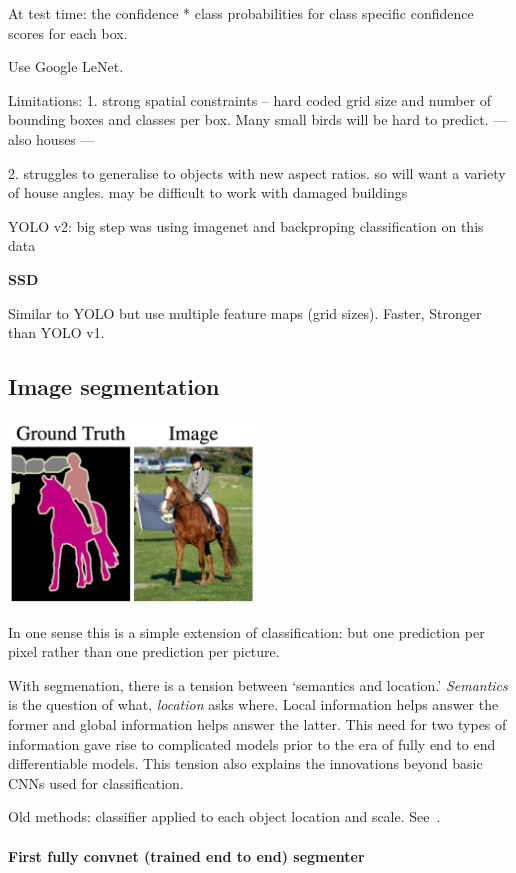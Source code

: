 \documentclass[12pt, a4paper, oneside, headinclude, footinclude]{article}
\begin{document}
At test time: the confidence * class probabilities for class specific
confidence scores for each box.

Use Google LeNet.

Limitations: 
1. strong spatial constraints -- hard coded grid size and number of
bounding boxes and classes per box. Many small birds will be hard to predict.
--- also houses ---

2. struggles to generalise to objects with new aspect ratios. so will want a
variety of house angles. may be difficult to work with damaged buildings 

YOLO v2: big step was using imagenet and backproping classification on this
data

\textbf{SSD}~\cite{liu2016ssd}

Similar to YOLO but use multiple feature maps (grid sizes). Faster, Stronger
than YOLO v1.

\subsection{Image segmentation}

\includegraphics[width=0.5\textwidth]{Figures/segmentation-example.png}

In one sense this is a simple extension of classification: but one prediction
per pixel rather than one prediction per picture.

With segmenation, there is a tension between `semantics and location.'
\textit{Semantics} is the question of what, \textit{location} asks where.
Local information helps answer the former and global information helps answer
the latter. This need for two types of information gave rise to complicated
models prior to the era of fully end to end differentiable models. This
tension also explains the innovations beyond basic CNNs used for
classification.

Old methods: classifier applied to each object location and scale.
See~\cite{NIPS2015_5852}.

\paragraph{First fully convnet (trained end to end) segmenter}
\end{document}

